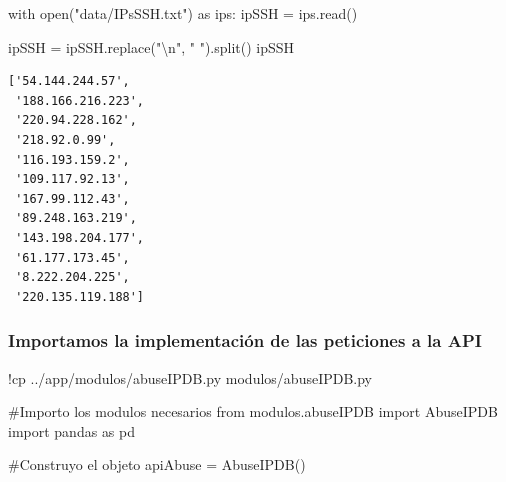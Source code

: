 \documentclass[
  letterpaper,
  DIV=11,
  numbers=noendperiod]{scrartcl}
\newenvironment{Shaded}{\begin{snugshade}}{\end{snugshade}}
\newcommand{\BuiltInTok}[1]{\textcolor[rgb]{0.00,0.23,0.31}{#1}}
\newcommand{\CharTok}[1]{\textcolor[rgb]{0.13,0.47,0.30}{#1}}
\newcommand{\CommentTok}[1]{\textcolor[rgb]{0.37,0.37,0.37}{#1}}
\newcommand{\ControlFlowTok}[1]{\textcolor[rgb]{0.00,0.23,0.31}{#1}}
\newcommand{\ImportTok}[1]{\textcolor[rgb]{0.00,0.46,0.62}{#1}}
\newcommand{\NormalTok}[1]{\textcolor[rgb]{0.00,0.23,0.31}{#1}}
\newcommand{\OperatorTok}[1]{\textcolor[rgb]{0.37,0.37,0.37}{#1}}
\newcommand{\StringTok}[1]{\textcolor[rgb]{0.13,0.47,0.30}{#1}}
\begin{document}
\begin{Shaded}
\begin{Highlighting}[]
\ControlFlowTok{with} \BuiltInTok{open}\NormalTok{(}\StringTok{"data/IPsSSH.txt"}\NormalTok{) }\ImportTok{as}\NormalTok{ ips:}
\NormalTok{    ipSSH }\OperatorTok{=}\NormalTok{ ips.read()}
    
\NormalTok{ipSSH }\OperatorTok{=}\NormalTok{ ipSSH.replace(}\StringTok{"}\CharTok{\textbackslash{}n}\StringTok{"}\NormalTok{, }\StringTok{" "}\NormalTok{).split()}
\NormalTok{ipSSH}
\end{Highlighting}
\end{Shaded}

\begin{verbatim}
['54.144.244.57',
 '188.166.216.223',
 '220.94.228.162',
 '218.92.0.99',
 '116.193.159.2',
 '109.117.92.13',
 '167.99.112.43',
 '89.248.163.219',
 '143.198.204.177',
 '61.177.173.45',
 '8.222.204.225',
 '220.135.119.188']
\end{verbatim}

\hypertarget{importamos-la-implementaciuxf3n-de-las-peticiones-a-la-api}{%
\subsubsection{Importamos la implementación de las peticiones a la
API}\label{importamos-la-implementaciuxf3n-de-las-peticiones-a-la-api}}

\begin{Shaded}
\begin{Highlighting}[]
\OperatorTok{!}\NormalTok{cp ..}\OperatorTok{/}\NormalTok{app}\OperatorTok{/}\NormalTok{modulos}\OperatorTok{/}\NormalTok{abuseIPDB.py modulos}\OperatorTok{/}\NormalTok{abuseIPDB.py}
\end{Highlighting}
\end{Shaded}

\begin{Shaded}
\begin{Highlighting}[]
\CommentTok{\#Importo los modulos necesarios}
\ImportTok{from}\NormalTok{ modulos.abuseIPDB }\ImportTok{import}\NormalTok{ AbuseIPDB}
\ImportTok{import}\NormalTok{ pandas }\ImportTok{as}\NormalTok{ pd}
\end{Highlighting}
\end{Shaded}

\begin{Shaded}
\begin{Highlighting}[]
\CommentTok{\#Construyo el objeto}
\NormalTok{apiAbuse }\OperatorTok{=}\NormalTok{ AbuseIPDB()}
\end{Highlighting}
\end{Shaded}
\end{document}
